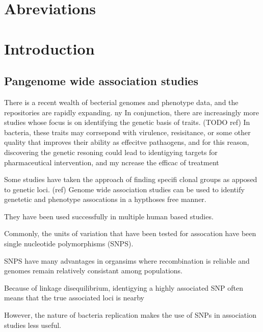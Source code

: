\documentclass[]{article}
\begin{document}
\hypertarget{abreviations}{%
\section{Abreviations}\label{abreviations}}

\printacronyms[include-classes=abbrev]

\hypertarget{introduction}{%
\section{Introduction}\label{introduction}}

\hypertarget{pangenome-wide-association-studies}{%
\subsection{Pangenome wide association
studies}\label{pangenome-wide-association-studies}}

There is a recent wealth of becterial genomes and phenotype data, and
the repositories are rapidly expanding. \ac{ny} In conjunction, there
are increasingly more studies whose focus is on identifying the genetic
basis of traits. (TODO ref) In bacteria, these traits may corrsepond
with virulence, resisitance, or some other quality that improves their
ability as effecitve pathaogens, and for this reason, discovering the
genetic resoning could lead to identigying targets for pharmaceutical
intervention, and my ncrease the efficac of treatment

Some studies have taken the approach of finding specifi clonal groups as
apposed to genetic loci. (ref) Genome wide association studies can be
used to identify genetetic and phenotype assocations in a hypthoses free
manner.

They have been used successfully in multiple human based studies.

Commonly, the units of variation that have been tested for assocation
have been single nucleotide polymorphisms (SNPS).

SNPS have many advantages in organsims where recombination is reliable
and genomes remain relatively consistant among populations.

Because of linkage disequilibrium, identigying a highly associated SNP
often means that the true associated loci is nearby

However, the nature of bacteria replication makes the use of SNPs in
association studies less useful.
\end{document}
